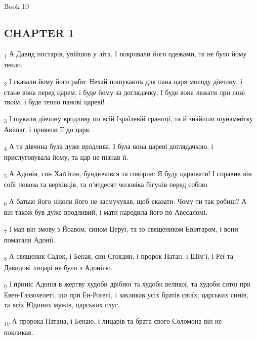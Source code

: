 Book 10
\subsection{CHAPTER 1}
\begin{tcolorbox}
\textsubscript{1} А Давид постарів, увійшов у літа. І покривали його одежами, та не було йому тепло.
\end{tcolorbox}
\begin{tcolorbox}
\textsubscript{2} І сказали йому його раби: Нехай пошукають для пана царя молоду дівчину, і стане вона перед царем, і буде йому за доглядачку. І буде вона лежати при лоні твоїм, і буде тепло панові цареві!
\end{tcolorbox}
\begin{tcolorbox}
\textsubscript{3} І шукали дівчину вродливу по всій Ізраїлевій границі, та й знайшли шунаммітку Авішаґ, і привели її до царя.
\end{tcolorbox}
\begin{tcolorbox}
\textsubscript{4} А та дівчина була дуже вродлива. І була вона цареві доглядачкою, і прислуговувала йому, та цар не пізнав її.
\end{tcolorbox}
\begin{tcolorbox}
\textsubscript{5} А Адонія, син Хаґґітин, бундючився та говорив: Я буду царювати! І справив він собі повоза та верхівців, та п'ятдесят чоловіка бігунів перед собою.
\end{tcolorbox}
\begin{tcolorbox}
\textsubscript{6} А батько його ніколи його не засмучував, щоб сказати: Чому ти так робиш? А він також був дуже вродливий, і мати народила його по Авесаломі.
\end{tcolorbox}
\begin{tcolorbox}
\textsubscript{7} І мав він змову з Йоавом, сином Церуї, та зо священиком Евіятаром, і вони помагали Адонії.
\end{tcolorbox}
\begin{tcolorbox}
\textsubscript{8} А священик Садок, і Беная, син Єгоядин, і пророк Натан, і Шім'ї, і Реї та Давидові лицарі не були з Адонією.
\end{tcolorbox}
\begin{tcolorbox}
\textsubscript{9} І приніс Адонія в жертву худоби дрібної та худоби великої, та худоби ситої при Евен-Газзохелеті, що при Ен-Роґелі, і закликав усіх братів своїх, царських синів, та всіх Юдиних мужів, царських слуг.
\end{tcolorbox}
\begin{tcolorbox}
\textsubscript{10} А пророка Натана, і Бенаю, і лицарів та брата свого Соломона він не покликав.
\end{tcolorbox}
